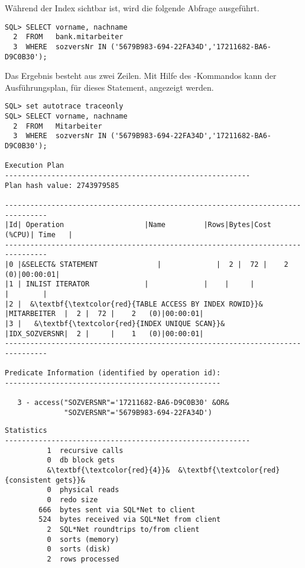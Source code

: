           W\"ahrend der Index  sichtbar ist, wird die folgende Abfrage ausgef\"uhrt.
          \begin{lstlisting}[caption={Abfrage mit sichtbarem Index},label=admin326,language=oracle_sql]
SQL> SELECT vorname, nachname
  2  FROM   bank.mitarbeiter
  3  WHERE  sozversNr IN ('5679B983-694-22FA34D','17211682-BA6-D9C0B30');
          \end{lstlisting}
          Das Ergebnis besteht aus zwei Zeilen. Mit Hilfe des -Kommandos kann der Ausf\"uhrungsplan, f\"ur dieses Statement, angezeigt werden.
          \begin{lstlisting}[caption={Ausf\"urungsplan f\"ur die Abfrage mit sichtbarem Index},label=admin327,language=oracle_sql,alsolanguage=sqlplus]
SQL> set autotrace traceonly
SQL> SELECT vorname, nachname
  2  FROM   Mitarbeiter
  3  WHERE  sozversNr IN ('5679B983-694-22FA34D','17211682-BA6-D9C0B30');

Execution Plan
----------------------------------------------------------
Plan hash value: 2743979585

--------------------------------------------------------------------------------
|Id| Operation                   |Name         |Rows|Bytes|Cost (%CPU)| Time   |
--------------------------------------------------------------------------------
|0 |&SELECT& STATEMENT              |             |  2 |  72 |    2   (0)|00:00:01|
|1 | INLIST ITERATOR             |             |    |     |           |        |
|2 |  &\textbf{\textcolor{red}{TABLE ACCESS BY INDEX ROWID}}&     |MITARBEITER  |  2 |  72 |    2   (0)|00:00:01|
|3 |   &\textbf{\textcolor{red}{INDEX UNIQUE SCAN}}&            |IDX_SOZVERSNR|  2 |     |    1   (0)|00:00:01|
--------------------------------------------------------------------------------

Predicate Information (identified by operation id):
---------------------------------------------------

   3 - access("SOZVERSNR"='17211682-BA6-D9C0B30' &OR&
              "SOZVERSNR"='5679B983-694-22FA34D')
          \end{lstlisting}
\clearpage
          \begin{lstlisting}[caption={Und so wird er wieder sichtbar -
          Fortsetzung},language=terminal]
Statistics
----------------------------------------------------------
          1  recursive calls
          0  db block gets
          &\textbf{\textcolor{red}{4}}&  &\textbf{\textcolor{red}{consistent gets}}&
          0  physical reads
          0  redo size
        666  bytes sent via SQL*Net to client
        524  bytes received via SQL*Net from client
          2  SQL*Net roundtrips to/from client
          0  sorts (memory)
          0  sorts (disk)
          2  rows processed
          \end{lstlisting}

